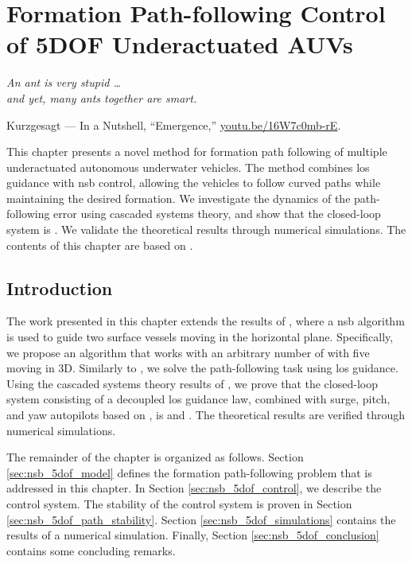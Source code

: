 \chapter{Formation Path-following Control of 5DOF Underactuated AUVs}
\label{chap:5dof_nsb}

\setlength{\epigraphwidth}{0.55\textwidth}
\epigraph{\it
    An ant is very stupid \dots \\ and yet, many ants together are smart.
}{
    Kurzgesagt --- In a Nutshell, ``Emergence,'' \url{youtu.be/16W7c0mb-rE}.
}

This chapter presents a novel method for formation path following of multiple underactuated autonomous underwater vehicles.
The method combines \acrlong{los} guidance with \acrlong{nsb} control, allowing the vehicles to follow curved paths while maintaining the desired formation.
We investigate the dynamics of the path-following error using cascaded systems theory, and show that the closed-loop system is .
We validate the theoretical results through numerical simulations.
The contents of this chapter are based on \cite{matouvs_formation_2022}.

\section{Introduction}

The work presented in this chapter extends the results of \cite{eek_formation_2021}, where a \acrfull{nsb} algorithm is used to guide two surface vessels moving in the horizontal plane.
Specifically, we propose an algorithm that works with an arbitrary number of  with five  moving in 3D.
Similarly to \cite{eek_formation_2021}, we solve the path-following task using \acrfull{los} guidance.
Using the cascaded systems theory results of \cite{pettersen_lyapunov_2017}, we prove that the closed-loop system consisting of a decoupled \gls{los} guidance law, combined with surge, pitch, and yaw autopilots based on \cite{moe_LOS_2016}, is  and .
The theoretical results are verified through numerical simulations.

The remainder of the chapter is organized as follows.
Section \ref{sec:nsb_5dof_model} defines the formation path-following problem that is addressed in this chapter.
In Section \ref{sec:nsb_5dof_control}, we describe the control system.
The stability of the control system is proven in Section \ref{sec:nsb_5dof_path_stability}.
Section \ref{sec:nsb_5dof_simulations} contains the results of a numerical simulation.
Finally, Section \ref{sec:nsb_5dof_conclusion} contains some concluding remarks.

